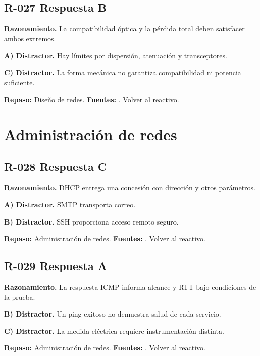 \subsection*{R-027 \quad Respuesta B}\label{s:R-027}
\textbf{Razonamiento.} La compatibilidad óptica y la pérdida total deben satisfacer ambos extremos.

\textbf{A) Distractor. }Hay límites por dispersión, atenuación y transceptores.

\textbf{C) Distractor. }La forma mecánica no garantiza compatibilidad ni potencia suficiente.

\textbf{Repaso:} \hyperref[sec:r1]{Diseño de redes}. \textbf{Fuentes:} \cite{rfc8200,rfc4632,networks,vlan}. \hyperref[q:R-027]{Volver al reactivo}.\par\medskip

\section{Administración de redes}

\subsection*{R-028 \quad Respuesta C}\label{s:R-028}
\textbf{Razonamiento.} DHCP entrega una concesión con dirección y otros parámetros.

\textbf{A) Distractor. }SMTP transporta correo.

\textbf{B) Distractor. }SSH proporciona acceso remoto seguro.

\textbf{Repaso:} \hyperref[sec:r2]{Administración de redes}. \textbf{Fuentes:} \cite{rfc2131,rfc1034,rfc9293,networks}. \hyperref[q:R-028]{Volver al reactivo}.\par\medskip

\subsection*{R-029 \quad Respuesta A}\label{s:R-029}
\textbf{Razonamiento.} La respuesta ICMP informa alcance y RTT bajo condiciones de la prueba.

\textbf{B) Distractor. }Un ping exitoso no demuestra salud de cada servicio.

\textbf{C) Distractor. }La medida eléctrica requiere instrumentación distinta.

\textbf{Repaso:} \hyperref[sec:r2]{Administración de redes}. \textbf{Fuentes:} \cite{rfc2131,rfc1034,rfc9293,networks}. \hyperref[q:R-029]{Volver al reactivo}.\par\medskip


